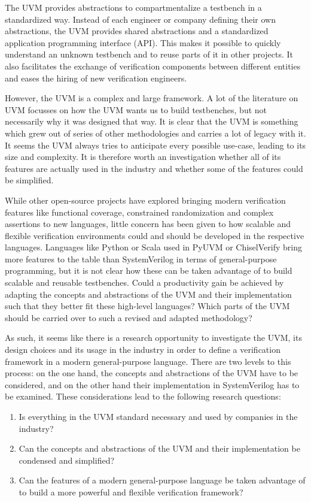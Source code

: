 \documentclass[11pt]{report}
\begin{document}
The UVM provides abstractions to compartmentalize a testbench in a standardized way. Instead of each engineer or
company defining their own abstractions, the UVM provides shared abstractions and a standardized application programming interface (API). This makes it possible to quickly
understand an unknown testbench and to reuse parts of it in other projects. It also facilitates the exchange of
verification components between different entities and eases the hiring of new verification engineers.

However, the UVM is a complex and large framework. A lot of the literature on UVM focusses on how the UVM wants us to
build testbenches, but not necessarily why it was designed that way. It is clear that the UVM is something which grew
out of series of other methodologies and carries a lot of legacy with it. It seems the UVM always tries to anticipate
every possible use-case, leading to its size and complexity. It is therefore worth an investigation whether all of
its features are actually used in the industry and whether some of the features could be simplified.

While other open-source projects have explored bringing modern verification features like functional coverage,
constrained randomization and complex assertions to new languages, little concern has been given to how scalable and
flexible verification environments could and should be developed in the respective languages. Languages like Python
or Scala used in PyUVM or ChiselVerify bring more features to the table than SystemVerilog in terms of
general-purpose programming, but it is not clear how these can be taken advantage of to build scalable and reusable
testbenches. Could a productivity gain be achieved by adapting the concepts and abstractions of the UVM and their
implementation such that they better fit these high-level languages? Which parts of the UVM should be carried over to
such a revised and adapted methodology?

As such, it seems like there is a research opportunity to investigate the UVM, its design choices and its usage in the industry in order to define a verification framework in a modern general-purpose language. There are two levels to this process: on the one hand, the concepts and abstractions of the UVM have to be considered, and on the other hand their implementation in SystemVerilog has to be examined. These considerations lead to the following research questions:

\begin{enumerate}
  \item Is everything in the UVM standard necessary and used by companies in the industry?
  \item Can the concepts and abstractions of the UVM and their implementation be condensed and simplified?
  \item Can the features of a modern general-purpose language be taken advantage of to build a more powerful and flexible verification framework?
\end{enumerate}
\end{document}
